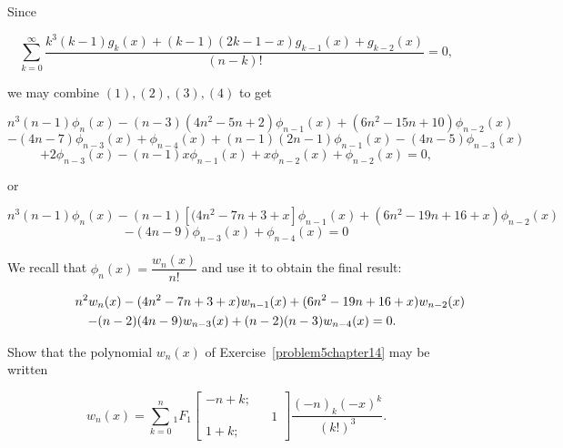 \begin{solution}
Since

$$\displaystyle\sum_{k=0}^{\infty} \dfrac{k^3(k-1)g_k(x)+(k-1)(2k-1-x)g_{k-1}(x)+g_{k-2}(x)}{(n-k)!} =0,$$

we may combine $(1),(2),(3),(4)$ to get

$$n^3(n-1)\phi_n(x) - (n-3)(4n^2-5n+2)\phi_{n-1}(x)+(6n^2-15n+10)\phi_{n-2}(x)$$
$$-(4n-7)\phi_{n-3}(x) + \phi_{n-4}(x) + (n-1)(2n-1) \phi_{n-1}(x) - (4n-5)\phi_{n-3}(x)$$
$$+2\phi_{n-3}(x) - (n-1)x\phi_{n-1}(x) + x\phi_{n-2}(x)+\phi_{n-2}(x)=0,$$

or

$$n^3(n-1)\phi_n(x)-(n-1)[(4n^2-7n+3+x]\phi_{n-1}(x)+ (6n^2-19n+16+x)\phi_{n-2}(x)$$
$$-(4n-9)\phi_{n-3}(x) + \phi_{n-4}(x)=0$$

We recall that $\phi_n(x) = \dfrac{w_n(x)}{n!}$ and use it to obtain the final result:

\begin{eqnarray*}
\lefteqn{n^2w_n(x) - (4n^2-7n+3+x)w_{n-1}(x) + (6n^2-19n+16+x)w_{n-2}(x)} \\
&&-(n-2)(4n-9)w_{n-3}(x)+(n-2)(n-3)w_{n-4}(x)=0.
\end{eqnarray*}
\end{solution}
\begin{problem}\label{problem6chapter14}
Show that the polynomial $w_n(x)$ of Exercise~\ref{problem5chapter14} may be written

$$w_n(x)=\displaystyle\sum_{k=0}^n {}_1F_1 \left[ \begin{array}{rlr}
-n+k; & & \\
& & 1 \\
1+k; & & 
\end{array} \right] \dfrac{(-n)_k (-x)^k}{(k!)^3}.$$
\end{problem}
